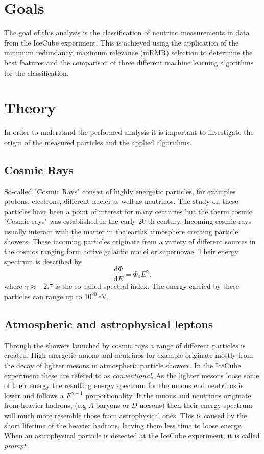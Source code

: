 \section{Goals}
The goal of this analysis is the classification of neutrino measurements in data from the IceCube experiment. 
This is achieved using the application of the minimum redundancy, maximum relevance (mRMR) selection to determine the best features and the comparison of three different machine learning algorithms for the classification.


\section{Theory}
\label{sec:Theory}
In order to understand the performed analysis it is important to investigate the origin of the measured particles and the applied algorithms. 

\subsection{Cosmic Rays}
So-called "Cosmic Rays" consist of highly energetic particles, for examples protons, electrons, different nuclei as well as neutrinos. 
The study on these particles have been a point of interest for many centuries but the therm cosmic "Cosmic rays" was established in the early 20-th century. 
Incoming cosmic rays usually interact with the matter in the earths atmosphere creating particle showers. 
These incoming particles originate from a variety of different sources in the cosmos ranging form active galactic nuclei or supernovae.
Their energy spectrum is described by
\begin{equation*}
	\frac{\mathrm{d}\Phi}{\mathrm{d}E} = \Phi_0 E^\gamma,
\end{equation*}
where $\gamma \approx -2.7$ is the so-called spectral index. 
The energy carried by these particles can range up to $10^{20}\,\unit{\eV}$.


\subsection{Atmospheric and astrophysical leptons}
Through the showers launched by cosmic rays a range of different particles is created. 
High energetic muons and neutrinos for example originate mostly from the decay of lighter mesons in atmospheric particle showers. 
In the IceCube experiment these are refered to as \textit{conventional}. 
As the lighter mesons loose some of their energy the resulting energy spectrum for the muons 
end neutrinos is lower and follows a $E^{\gamma-1}$ proportionality. 
If the muons and neutrinos originate from heavier hadrons, 
(e.g $\Lambda$-baryons or $D$-mesons) then their energy spectrum will much more resemble those from astrophysical ones. 
This is caused by the short lifetime of the heavier hadrons, leaving them less time to loose energy.
When an astrophysical particle is detected at the IceCube experiment, it is called \textit{prompt}.

